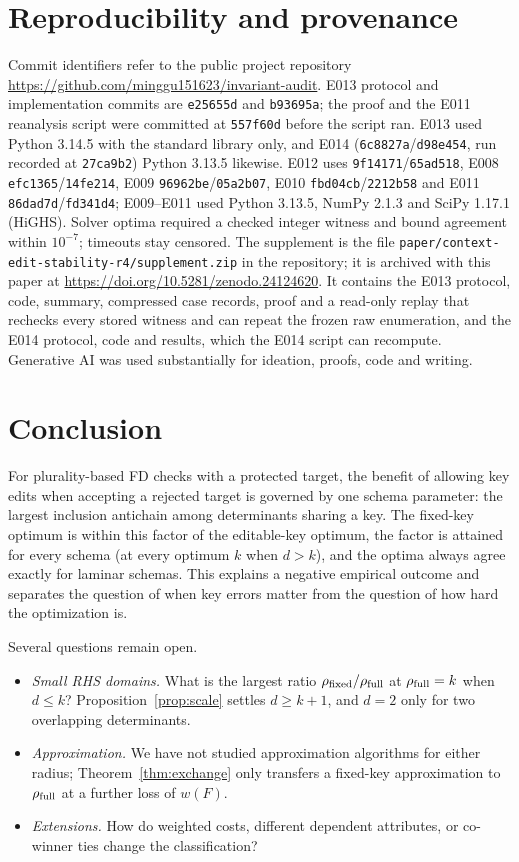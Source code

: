 \documentclass[11pt]{article}
\theoremstyle{remark}
\newcommand{\rfull}{\rho_{\rm full}}
\newcommand{\rfix}{\rho_{\rm fixed}}
\begin{document}
\section{Reproducibility and provenance}
Commit identifiers refer to the public project repository
\url{https://github.com/minggu151623/invariant-audit}. E013 protocol and implementation commits are \texttt{e25655d} and
\texttt{b93695a}; the proof and the E011 reanalysis script were committed at
\texttt{557f60d} before the script ran. E013 used Python 3.14.5 with the
standard library only, and E014 (\texttt{6c8827a}/\texttt{d98e454}, run
recorded at \texttt{27ca9b2}) Python 3.13.5 likewise. E012 uses \texttt{9f14171}/\texttt{65ad518}, E008
\texttt{efc1365}/\texttt{14fe214}, E009 \texttt{96962be}/\texttt{05a2b07}, E010
\texttt{fbd04cb}/\texttt{2212b58} and E011 \texttt{86dad7d}/\texttt{fd341d4};
E009--E011 used Python 3.13.5, NumPy 2.1.3 and SciPy 1.17.1 (HiGHS). Solver
optima required a checked integer witness and bound agreement within $10^{-7}$;
timeouts stay censored. The supplement is the file
\nolinkurl{paper/context-edit-stability-r4/supplement.zip} in the repository;
it is archived with this paper at
\url{https://doi.org/10.5281/zenodo.24124620}. It
contains the E013 protocol, code, summary, compressed case records, proof and a
read-only replay that rechecks every stored witness and can repeat the frozen
raw enumeration, and the E014 protocol, code and results, which the E014
script can recompute. Generative AI was
used substantially for ideation, proofs, code and writing.

\section{Conclusion}
For plurality-based FD checks with a protected target, the benefit of allowing
key edits when accepting a rejected target is governed by one schema parameter:
the largest inclusion antichain among determinants sharing a key. The fixed-key
optimum is within this factor of the editable-key optimum, the factor is
attained for every schema (at every optimum $k$ when $d>k$), and the optima
always agree exactly for laminar schemas. This explains a negative empirical outcome and separates the question
of when key errors matter from the question of how hard the optimization is.

Several questions remain open.
\begin{itemize}
\item \emph{Small RHS domains.} What is the largest ratio $\rfix/\rfull$ at
$\rfull=k$ when $d\le k$? Proposition~\ref{prop:scale} settles $d\ge k+1$, and
$d=2$ only for two overlapping determinants.
\item \emph{Approximation.} We have not studied approximation algorithms for
either radius; Theorem~\ref{thm:exchange} only transfers a fixed-key
approximation to $\rfull$ at a further loss of $w(F)$.
\item \emph{Extensions.} How do weighted costs, different dependent attributes,
or co-winner ties change the classification?
\end{itemize}
\end{document}
